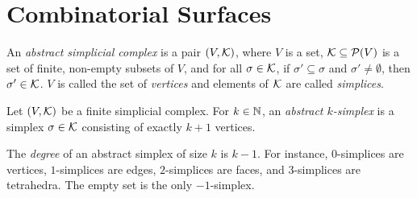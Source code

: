 \chapter{Combinatorial Surfaces}
\label{chap:combinatorial_surfaces}



\begin{definition}
  \label{def:abstract_simplicial_complex}
  \leanok
  An \emph{abstract simplicial complex} is a pair $(V,\mathcal{K})$, 
  where $V$ is a set, 
  $\mathcal{K} \subseteq \mathcal{P}(V)$ is a set of finite, non-empty subsets of $V$, 
  and for all $\sigma \in \mathcal{K}$, 
  if $\sigma' \subseteq \sigma$ and $\sigma' \neq \emptyset$, 
  then $\sigma' \in \mathcal{K}$. 
  $V$ is called the set of \emph{vertices} 
  and elements of $\mathcal{K}$ are called \emph{simplices}.
\end{definition}

\begin{definition}
  \label{def:abstract_simplex}
  \leanok
  Let $(V,\mathcal{K})$ be a finite simplicial complex. 
  For $k \in \mathbb{N}$, an \emph{abstract $k$-simplex} is 
  a simplex $\sigma \in \mathcal{K}$ consisting of exactly $k+1$ vertices.
\end{definition}

\begin{definition}
    \label{def:degree}
    The \emph{degree} of an abstract simplex of size $k$ is $k-1$. For instance, $0$-simplices are vertices, $1$-simplices are edges, $2$-simplices are faces, and $3$-simplices are tetrahedra. The empty set is the only $-1$-simplex.
\end{definition}

